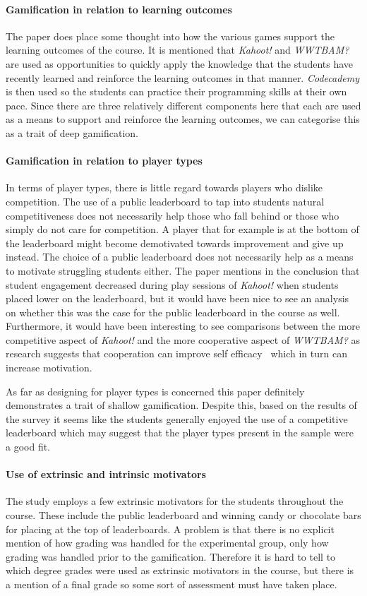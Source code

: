 \paragraph{Gamification in relation to learning outcomes}
The paper does place some thought into how the various games support the learning outcomes of the course. It is mentioned that \emph{Kahoot!} and \emph{WWTBAM?} are used as opportunities to quickly apply the knowledge that the students have recently learned and reinforce the learning outcomes in that manner. \emph{Codecademy} is then used so the students can practice their programming skills at their own pace. Since there are three relatively different components here that each are used as a means to support and reinforce the learning outcomes, we can categorise this as a trait of deep gamification.  

\paragraph{Gamification in relation to player types}
In terms of player types, there is little regard towards players who dislike competition. The use of a public leaderboard to tap into students natural competitiveness does not necessarily help those who fall behind or those who simply do not care for competition. A player that for example is at the bottom of the leaderboard might become demotivated towards improvement and give up instead. The choice of a public leaderboard does not necessarily help as a means to motivate struggling students either. The paper mentions in the conclusion that student engagement decreased during play sessions of \emph{Kahoot!} when students placed lower on the leaderboard, but it would have been nice to see an analysis on whether this was the case for the public leaderboard in the course as well. Furthermore, it would have been interesting to see comparisons between the more competitive aspect of \emph{Kahoot!} and the more cooperative aspect of \emph{WWTBAM?} as research suggests that cooperation can improve self efficacy~\cite{staiano2013adolescent} which in turn can increase motivation. 

As far as designing for player types is concerned this paper definitely demonstrates a trait of shallow gamification. 
Despite this, based on the results of the survey it seems like the students generally enjoyed the use of a competitive leaderboard which may suggest that the player types present in the sample were a good fit. 

\paragraph{Use of extrinsic and intrinsic motivators}
The study employs a few extrinsic motivators for the students throughout the course. These include the public leaderboard and winning candy or chocolate bars for placing at the top of leaderboards. A problem is that there is no explicit mention of how grading was handled for the experimental group, only how grading was handled prior to the gamification. Therefore it is hard to tell to which degree grades were used as extrinsic motivators in the course, but there is a mention of a final grade so some sort of assessment must have taken place. 

